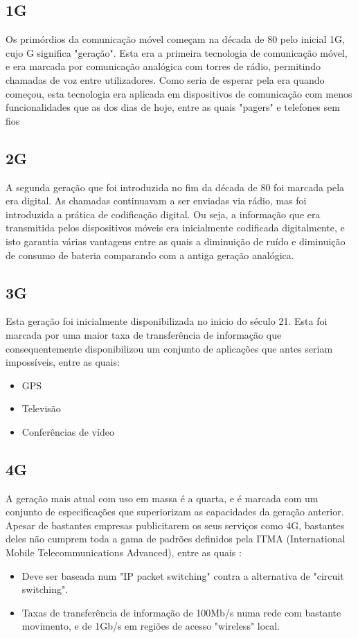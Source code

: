 \documentclass{llncs}
\begin{document}
\subsection{1G}
\hspace*{1.5em}Os primórdios da comunicação móvel começam na década de 80 pelo inicial 1G, cujo G significa "geração". Esta era a primeira tecnologia de comunicação móvel, e era marcada por comunicação analógica com torres de rádio, permitindo chamadas de voz entre utilizadores. Como seria de esperar pela era quando começou, esta tecnologia era aplicada em dispositivos de comunicação com menos funcionalidades que as dos dias de hoje, entre as quais "pagers" e telefones sem fios \cite{Ton:Pan:Kus}
\subsection{2G}
\hspace*{1.5em}A segunda geração que foi introduzida no fim da década de 80 \cite{Ton:Pan:Kus} foi marcada pela era digital. As chamadas continuavam a ser enviadas via rádio, mas foi introduzida a prática de codificação digital. Ou seja, a informação que era transmitida pelos dispositivos móveis era inicialmente codificada digitalmente, e isto garantia várias vantagens entre as quais a diminuição de ruído e diminuição de consumo de bateria comparando com a antiga geração analógica.
\subsection{3G}
\hspace*{1.5em}Esta geração foi inicialmente disponibilizada no inicio do século 21. Esta foi marcada por uma maior taxa de transferência de informação que consequentemente disponibilizou um conjunto de aplicações que antes seriam impossíveis, entre as quais:
\begin{itemize}
    \item GPS
    \item Televisão
    \item Conferências de vídeo
\end{itemize}
\subsection{4G}
\hspace*{1.5em}A geração mais atual com uso em massa é a quarta, e é marcada com um conjunto de especificações que superiorizam as capacidades da geração anterior. Apesar de bastantes empresas publicitarem os seus serviços como 4G, bastantes deles não cumprem toda a gama de padrões definidos pela ITMA (International Mobile Telecommunications Advanced), entre as quais \cite{standards}:
\begin{itemize}
    \item Deve ser baseada num "IP packet switching" contra a alternativa de "circuit switching".
    \item Taxas de transferência de informação de 100Mb/s numa rede com bastante movimento, e de 1Gb/s em regiões de acesso "wireless" local.
\end{itemize}
\end{document}
